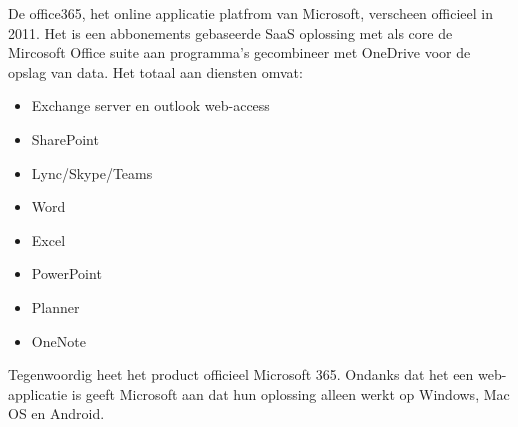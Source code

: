 De office365, het online applicatie platfrom van Microsoft, verscheen officieel in 2011. Het is een abbonements gebaseerde SaaS oplossing met als core de Mircosoft Office suite aan programma's gecombineer met OneDrive voor de opslag van data. Het totaal aan diensten omvat:
\begin{itemize}
	\item Exchange server en outlook web-access
	\item SharePoint
	\item Lync/Skype/Teams
	\item Word
	\item Excel
	\item PowerPoint
	\item Planner
	\item OneNote
\end{itemize}

Tegenwoordig heet het product officieel Microsoft 365. Ondanks dat het een web-applicatie is geeft Microsoft aan dat hun oplossing alleen werkt op Windows, Mac OS en Android.
